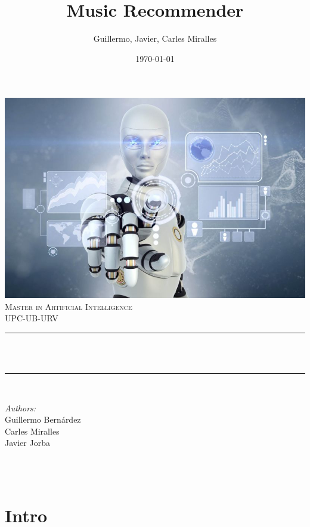 \documentclass[12pt]{article}
\title{Music Recommender}								%
\author{Guillermo,
	Javier,
	Carles Miralles
}
\date{\today}											%
\makeatletter
\let\thetitle\@title
\let\thedate\@date
\makeatother
\begin{document}

\begin{titlepage}
	\centering
    \includegraphics[scale = 0.5]{logo.jpg}\\[1.0 cm]	%
    \textsc{\LARGE Master in Artificial Intelligence}\\[1 cm]	%
	\textsc{\Large UPC-UB-URV}\\[0.5 cm]				%

	\rule{\linewidth}{0.2 mm} \\[0.4 cm]
	{ \huge \bfseries \thetitle}\\
	\rule{\linewidth}{0.2 mm} \\[1.25 cm]


	
	\begin{minipage}[centering]{1\textwidth}
		\centering
		\large
		\emph{Authors:}\\
		Guillermo Bernárdez \\
		Carles Miralles \\
		Javier Jorba\\
	\end{minipage}\\[1cm]
	
	{\large\thedate}\\
 
	\vfill
	
\end{titlepage}


\tableofcontents
\pagebreak


\section{Intro}

\hspace{1 cm}

\newpage


\end{document}
